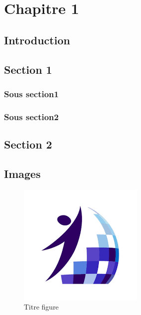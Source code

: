 \chapter{Chapitre 1}


\section*{Introduction}


\section{Section 1} 
    \subsection{Sous section1}
    \subsection{Sous section2}

\section{Section 2 }

\section{Images}
\begin{figure}[H]
        \centering
        \includegraphics[width=0.9\columnwidth]{img/tekup.png}
        \caption{Titre figure}
        \label{fig1}
        \end{figure}
        
